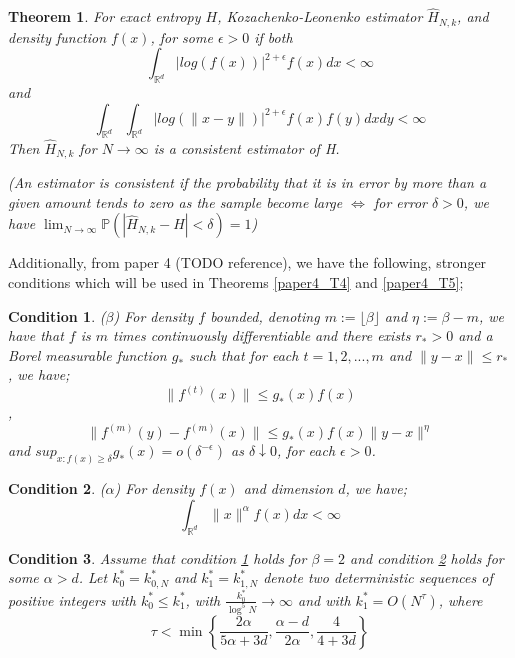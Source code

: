 \documentclass{article}
\newtheorem{theorem}{Theorem}
\newtheorem{remark}{Condition}
\begin{document}
\begin{theorem} \label{paper1_T2}
For exact entropy $H$, Kozachenko-Leonenko estimator $\hat{H}_{N,k}$, and density function $f(x)$, for some $\epsilon > 0$ if both
\begin{equation} \label{paper1_T2_eq1}
\int_{\mathbb{R}^{d}} | log(f(x))|^{2 + \epsilon} f(x) dx < \infty \nonumber
\end{equation}
and
\begin{equation} \label{paper1_T2_eq2}
\int_{\mathbb{R}^{d}} \int_{\mathbb{R}^{d}} | log(\|x-y\|)|^{2+ \epsilon} f(x) f(y) dx dy < \infty \nonumber
\end{equation}
Then $\hat{H}_{N, k}$ for $N \to \infty$ is a consistent estimator of H.

(An estimator is consistent if the probability that it is in error by more than a given amount tends to zero as the sample become large $\Leftrightarrow $ for error $\delta > 0$, we have $\lim_{N \to \infty} \mathbb{P}(|\hat{H}_{N,k} - H| < \delta) = 1$) 
\end{theorem}

Additionally, from paper 4 (TODO reference), we have the following, stronger conditions which will be used in Theorems \ref{paper4_T4} and \ref{paper4_T5};
\begin{remark} ($\beta$) \label{A1}
For density $f$ bounded, denoting $m := \lfloor \beta \rfloor$ and $\eta := \beta -m$, we have that $f$ is $m$ times continuously differentiable and there exists $r_{*} > 0$ and a Borel measurable function $g_{*}$ such that for each $t = 1, 2, ... , m$ and $\|y-x\| \leq r_{*}$, we have;
\begin{equation}
\| f^{(t)} (x) \| \leq g_{*}(x)f(x) \nonumber
\end{equation},
\begin{equation}
\| f^{(m)} (y) - f^{(m)} (x) \| \leq g_{*}(x)f(x) \|y-x\|^{\eta} \nonumber
\end{equation}
and $sup_{x:f(x)\geq \delta} g_{*}(x) = o(\delta^{-\epsilon})$ as $\delta \downarrow 0$, for each $\epsilon > 0$.
\end{remark}

\begin{remark} ($\alpha$) \label{A2}
For density $f(x)$ and dimension $d$, we have;
\begin{equation}
\int_{\mathbb{R}^{d}} \| x \|^{\alpha} f(x) dx < \infty \nonumber
\end{equation}
\end{remark}

\begin{remark} \label{A3}
Assume that condition \ref{A1} holds for $\beta = 2$ and condition \ref{A2} holds for some $\alpha > d$. Let $k_{0}^{*} = k_{0, N}^{*}$ and $k_{1}^{*} = k_{1, N}^{*}$ denote two deterministic sequences of positive integers with $k_{0}^{*} \leq k_{1}^{*}$, with $\frac{k_{0}^{*}}{\log^{5}{N}} \to \infty$ and with $k_{1}^{*} = O(N^{\tau})$, where
\begin{equation}
\tau < \min \left\{ \frac{2 \alpha}{5 \alpha + 3d} , \frac{\alpha - d}{2 \alpha} , \frac{4}{4 + 3d} \right\} \nonumber
\end{equation}
\end{remark}
\end{document}
